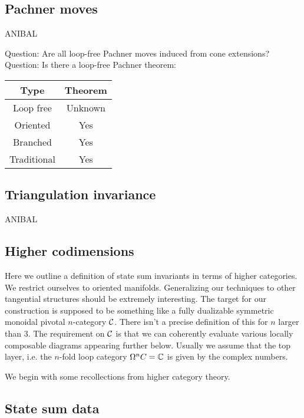 \subsection{Pachner moves}

ANIBAL

Question: Are all loop-free Pachner moves induced from cone extensions?
Question: Is there a loop-free Pachner theorem:
\begin{center}
	\begin{tabular}{|c|c|}
		\hline
		Type & Theorem \\ \hline
		Loop free & Unknown \\
		Oriented & Yes \\
		Branched & Yes \\
		Traditional & Yes \\ \hline
	\end{tabular}
\end{center}

\subsection{Triangulation invariance}

ANIBAL

\subsection{Higher codimensions}



\newpage

Here we outline a definition of state sum invariants in terms of higher categories.
We restrict ourselves to oriented manifolds.
Generalizing our techniques to other tangential structures should be extremely interesting.
The target for our construction is supposed to be something like a fully dualizable symmetric monoidal pivotal $n$-category $\mathcal{C}$.
There isn't a precise definition of this for $n$ larger than 3. The requirement on $\mathcal{C}$ is that we can coherently evaluate various locally composable diagrams appearing further below.
Usually we assume that the top layer, i.e.
the $n$-fold loop category $\Omega^n C = \mathbb{C} $ is given by the complex numbers.

We begin with some recollections from higher category theory.

\subsection{State sum data}

